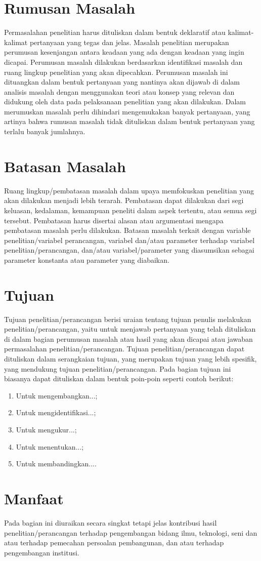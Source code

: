 \section{Rumusan Masalah}
Permasalahan penelitian harus dituliskan dalam bentuk deklaratif atau kalimat-kalimat pertanyaan yang tegas dan jelas. Masalah penelitian merupakan perumusan kesenjangan antara keadaan yang ada dengan keadaan yang ingin dicapai. Perumusan masalah dilakukan berdasarkan identifikasi masalah dan ruang lingkup penelitian yang akan dipecahkan. Perumusan masalah ini dituangkan dalam bentuk pertanyaan yang nantinya akan dijawab di dalam analisis masalah dengan menggunakan teori atau konsep yang relevan dan didukung oleh data pada pelaksanaan penelitian yang akan dilakukan. Dalam merumuskan masalah perlu dihindari mengemukakan banyak pertanyaan, yang artinya bahwa rumusan masalah tidak dituliskan dalam bentuk pertanyaan yang terlalu banyak jumlahnya.

\section{Batasan Masalah}
Ruang lingkup/pembatasan masalah dalam upaya memfokuskan penelitian yang akan dilakukan menjadi lebih terarah. Pembatasan dapat dilakukan dari segi keluasan, kedalaman, kemampuan peneliti dalam aspek tertentu, atau semua segi tersebut. Pembatasan harus disertai alasan atau argumentasi mengapa pembatasan masalah perlu dilakukan. Batasan masalah terkait dengan variable penelitian/variabel perancangan, variabel dan/atau parameter terhadap variabel penelitian/perancangan, dan/atau variabel/parameter yang diasumsikan sebagai parameter konstanta atau parameter yang diabaikan.

\section{Tujuan}
Tujuan penelitian/perancangan berisi uraian tentang tujuan penulis melakukan penelitian/perancangan, yaitu untuk menjawab pertanyaan yang telah dituliskan di dalam bagian perumusan masalah atau hasil yang akan dicapai atau jawaban permasalahan penelitian/perancangan. Tujuan penelitian/perancangan dapat dituliskan dalam serangkaian tujuan, yang merupakan tujuan yang lebih spesifik, yang mendukung tujuan penelitian/perancangan. Pada bagian tujuan ini biasanya dapat dituliskan dalam bentuk poin-poin seperti contoh berikut:
\begin{enumerate}[leftmargin=1.25cm] %
    \item Untuk mengembangkan...;
    \item Untuk mengidentifikasi...;
    \item Untuk mengukur...;
    \item Untuk menentukan...;
    \item Untuk membandingkan.... 
\end{enumerate}
\section{Manfaat}
Pada bagian ini diuraikan secara singkat tetapi jelas kontribusi hasil penelitian/perancangan terhadap pengembangan bidang ilmu, teknologi, seni dan atau terhadap pemecahan persoalan pembangunan, dan atau terhadap pengembangan institusi.
